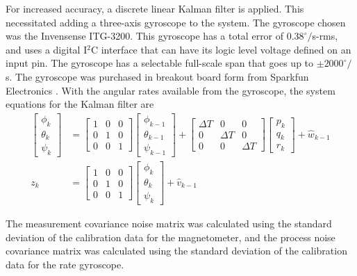 \documentclass[]{aiaa-tc}%
\begin{document}
For increased accuracy, a discrete linear Kalman filter is applied. This necessitated adding a three-axis gyroscope to the system. The gyroscope chosen was the Invensense ITG-3200. This gyroscope has a total error of $0.38^\circ/$s-rms, and uses a digital I$^2$C interface that can have its logic level voltage defined on an input pin. The gyroscope has a selectable full-scale span that goes up to $\pm2000^\circ/$s. The gyroscope was purchased in breakout board form from Sparkfun Electronics \cite{itg3200DataSheet}.
With the angular rates available from the gyroscope, the system equations for the Kalman filter are
\begin{align}
\begin{bmatrix}
\phi_{k}\\
\theta_{k}\\
\psi_{k}
\end{bmatrix} & = \begin{bmatrix}
1 & 0 & 0\\0 & 1 & 0\\0 & 0 & 1
\end{bmatrix}\begin{bmatrix}
\phi_{k-1}\\
\theta_{k-1}\\
\psi_{k-1}
\end{bmatrix}
+ \begin{bmatrix}
\Delta T & 0 & 0 \\ 0 & \Delta T & 0\\0 & 0 & \Delta T
\end{bmatrix}\begin{bmatrix} 
p_k \\ q_k \\ r_k 
\end{bmatrix}+\hat{w}_{k-1}\\
z_k & = \begin{bmatrix}
1 & 0 &0\\0&1&0\\0&0&1
\end{bmatrix}\begin{bmatrix}
\phi_{k}\\
\theta_{k}\\
\psi_{k}
\end{bmatrix}+\hat{v}_{k-1}
\end{align}

The measurement covariance noise matrix was calculated using the standard deviation of the calibration data for the magnetometer, and the process noise covariance matrix was calculated using the standard deviation of the calibration data for the rate gyroscope.
\end{document}

